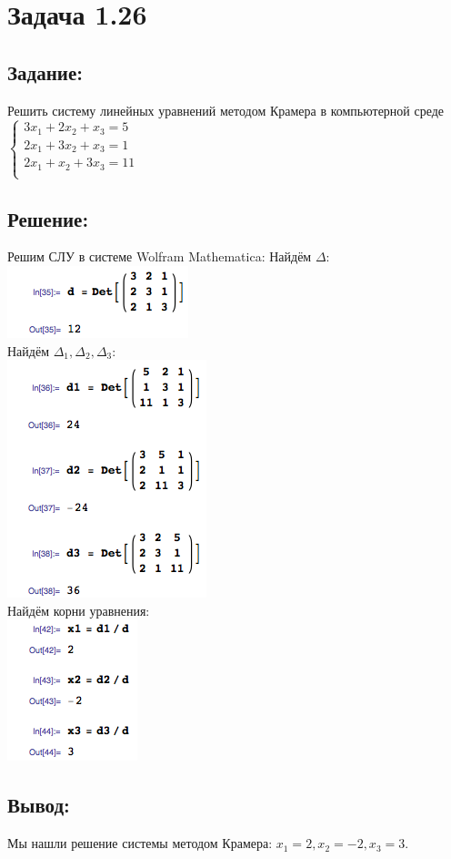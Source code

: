 \section{Задача 1.26}
\subsection{Задание:}
Решить систему линейных уравнений методом Крамера в компьютерной среде
\\[1em]
$
	\begin{cases}
		3x_1 + 2x_2 + x_3 = 5  \\
		2x_1 + 3x_2 + x_3 = 1  \\
		2x_1 + x_2 + 3x_3 = 11 \\
	\end{cases}
$
\subsection{Решение:}
Решим СЛУ в системе Wolfram Mathematica:
Найдём $ \Delta $:
\\
\includegraphics[scale=0.6]{task/1_26/screen1.png}
\\
Найдём $ \Delta_1, \Delta_2, \Delta_3 $:
\\
\includegraphics[scale=0.6]{task/1_26/screen2.png}
\\
Найдём корни уравнения:
\\
\includegraphics[scale=0.6]{task/1_26/screen3.png}
\\
\subsection{Вывод:}
Мы нашли решение системы методом Крамера: $ x_1 = 2, x_2 = -2, x_3 = 3 $.
